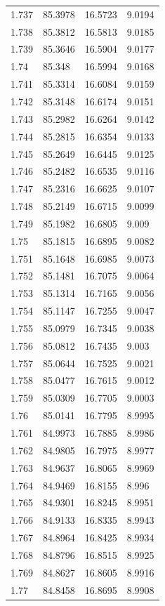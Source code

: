\begin{tabular}{llll}
1.737 & 85.3978 & 16.5723 & 9.0194 \\
1.738 & 85.3812 & 16.5813 & 9.0185 \\
1.739 & 85.3646 & 16.5904 & 9.0177 \\
1.74 & 85.348 & 16.5994 & 9.0168 \\
1.741 & 85.3314 & 16.6084 & 9.0159 \\
1.742 & 85.3148 & 16.6174 & 9.0151 \\
1.743 & 85.2982 & 16.6264 & 9.0142 \\
1.744 & 85.2815 & 16.6354 & 9.0133 \\
1.745 & 85.2649 & 16.6445 & 9.0125 \\
1.746 & 85.2482 & 16.6535 & 9.0116 \\
1.747 & 85.2316 & 16.6625 & 9.0107 \\
1.748 & 85.2149 & 16.6715 & 9.0099 \\
1.749 & 85.1982 & 16.6805 & 9.009 \\
1.75 & 85.1815 & 16.6895 & 9.0082 \\
1.751 & 85.1648 & 16.6985 & 9.0073 \\
1.752 & 85.1481 & 16.7075 & 9.0064 \\
1.753 & 85.1314 & 16.7165 & 9.0056 \\
1.754 & 85.1147 & 16.7255 & 9.0047 \\
1.755 & 85.0979 & 16.7345 & 9.0038 \\
1.756 & 85.0812 & 16.7435 & 9.003 \\
1.757 & 85.0644 & 16.7525 & 9.0021 \\
1.758 & 85.0477 & 16.7615 & 9.0012 \\
1.759 & 85.0309 & 16.7705 & 9.0003 \\
1.76 & 85.0141 & 16.7795 & 8.9995 \\
1.761 & 84.9973 & 16.7885 & 8.9986 \\
1.762 & 84.9805 & 16.7975 & 8.9977 \\
1.763 & 84.9637 & 16.8065 & 8.9969 \\
1.764 & 84.9469 & 16.8155 & 8.996 \\
1.765 & 84.9301 & 16.8245 & 8.9951 \\
1.766 & 84.9133 & 16.8335 & 8.9943 \\
1.767 & 84.8964 & 16.8425 & 8.9934 \\
1.768 & 84.8796 & 16.8515 & 8.9925 \\
1.769 & 84.8627 & 16.8605 & 8.9916 \\
1.77 & 84.8458 & 16.8695 & 8.9908 \\

\end{tabular}
